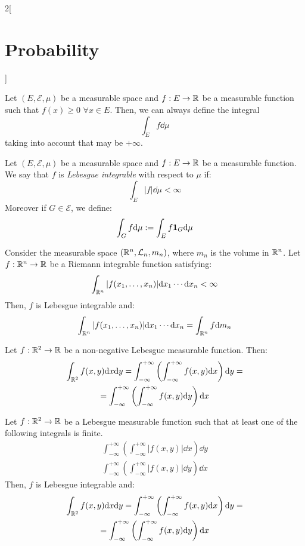 \documentclass[../../../main.tex]{subfiles}
\begin{document}
\begin{multicols}{2}[\section{Probability}]
\begin{definition}
  \end{definition}
  \begin{prop}
    Let $(E,\mathcal{E},\mu)$ be a measurable space and $f:E\rightarrow\mathbb{R}$ be a measurable function such that $f(x)\geq 0$ $\forall x\in E$. Then, we can always define the integral $$\int_Ef\dd\mu$$ taking into account that may be $+\infty$.
  \end{prop}
  \begin{definition}
    Let $(E,\mathcal{E},\mu)$ be a measurable space and $f:E\rightarrow\mathbb{R}$ be a measurable function. We say that $f$ is \textit{Lebesgue integrable} with respect to $\mu$ if: $$\int_E|f|\dd\mu<\infty$$
    Moreover if $G\in\mathcal{E}$, we define: $$\int_Gf\dd\mu:=\int_Ef\boldsymbol{\mathrm{1}}_G\dd\mu$$
  \end{definition}
  \begin{prop}
    Consider the measurable space $(\mathbb{R}^n,\mathcal{L}_n,m_n)$, where $m_n$ is the volume in $\mathbb{R}^n$. Let $f:\mathbb{R}^n\rightarrow\mathbb{R}$ be a Riemann integrable function satisfying: $$\int_{\mathbb{R}^n}|f(x_1,\ldots,x_n)|\dd x_1\cdots\dd x_n<\infty$$
    Then, $f$ is Lebesgue integrable and: $$\int_{\mathbb{R}^n}|f(x_1,\ldots,x_n)|\dd x_1\cdots\dd x_n=\int_{\mathbb{R}^n}f\dd m_n$$
  \end{prop}
  \begin{theorem}
    Let $f:\mathbb{R}^2\rightarrow\mathbb{R}$ be a non-negative Lebesgue measurable function. Then:
    \begin{multline*}
      \int_{\mathbb{R}^2}f(x,y)\dd x\dd y=\int_{-\infty}^{+\infty}\left(\int_{-\infty}^{+\infty}f(x,y)\dd x\right)\dd y=\\=\int_{-\infty}^{+\infty}\left(\int_{-\infty}^{+\infty}f(x,y)\dd y\right)\dd x
    \end{multline*}
  \end{theorem}
  \begin{theorem}
    Let $f:\mathbb{R}^2\rightarrow\mathbb{R}$ be a Lebesgue measurable function such that at least one of the following integrals is finite.
    \begin{gather*}
      \int_{-\infty}^{+\infty}\left(\int_{-\infty}^{+\infty}|f(x,y)|\dd x\right)\dd y\\
      \int_{-\infty}^{+\infty}\left(\int_{-\infty}^{+\infty}|f(x,y)|\dd y\right)\dd x
    \end{gather*}
    Then, $f$ is Lebesgue integrable and:
    \begin{multline*}
      \int_{\mathbb{R}^2}f(x,y)\dd x\dd y=\int_{-\infty}^{+\infty}\left(\int_{-\infty}^{+\infty}f(x,y)\dd x\right)\dd y=\\=\int_{-\infty}^{+\infty}\left(\int_{-\infty}^{+\infty}f(x,y)\dd y\right)\dd x
    \end{multline*}
  \end{theorem}

\end{multicols}
\end{document}
